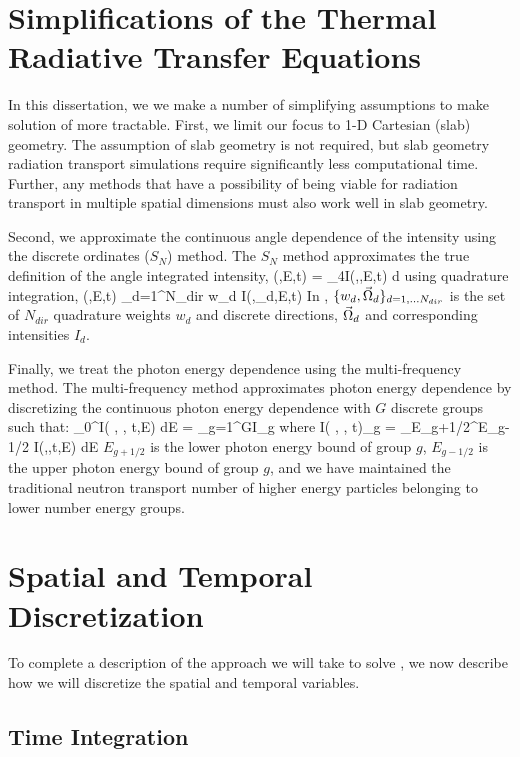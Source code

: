 \section{Simplifications of the Thermal Radiative Transfer Equations}
In this dissertation, we we make a number of simplifying assumptions to make solution of  more tractable.  
First, we limit our focus to 1-D Cartesian (slab) geometry.
The assumption of slab geometry is not required, but slab geometry radiation transport simulations require significantly less computational time.
Further, any methods that have a possibility of being viable for radiation transport in multiple spatial dimensions must also work well in slab geometry.

Second, we approximate the continuous angle dependence of the intensity using the discrete ordinates ($S_N$) method.
The $S_N$ method approximates the true definition of the angle integrated intensity,
\be
\phi(,E,t) = \int_{4\pi}{I(,\omg,E,t) d\omg} \pec
\ee
using quadrature integration,
\benum
\phi(,E,t) \approx \sum_{d=1}^{N_{dir}}{ w_d I(,\omg_d,E,t) } \pep
\label{eq:sn_def}
\eenum
In , $\{w_d,\vec{\Omega}_d \}_{d=1,\dots N_{dir}}$ is the set of $N_{dir}$ quadrature weights $w_d$ and discrete directions, $\vec{\Omega}_d$ and corresponding intensities $I_d$.

Finally, we  treat the photon energy dependence using the multi-frequency method.  The multi-frequency method approximates photon energy dependence by discretizing the continuous photon energy dependence with $G$ discrete groups such that:
\benum
\int_{0}^{\infty}{I( , \omg, t,E) dE} = \sum_{g=1}^G{I_g} \pec
\eenum
where
\benum
I( , \omg, t)_g = \int_{E_{g+1/2}}^{E_{g-1/2}}{ I(,\omg,t,E) dE} \pec
\eenum
$E_{g+1/2}$ is the lower photon energy bound of group $g$, $E_{g-1/2}$ is the upper photon energy bound of group $g$, and we have maintained the traditional neutron transport number of higher energy particles belonging to lower number energy groups.

\section{Spatial and Temporal Discretization}

To complete a description of the approach we will take to solve , we now describe how we will discretize the spatial and temporal variables.

\subsection{Time Integration}


